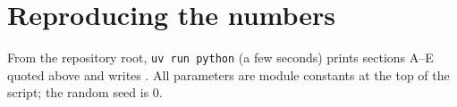 \documentclass[11pt,a4paper]{article}
\theoremstyle{remark}
\begin{document}
\appendix
\section{Reproducing the numbers}
From the repository root, \texttt{uv run python}  (a few seconds) prints sections A--E quoted above and writes . All parameters are module constants at the top of the script; the random seed is $0$.
\end{document}
